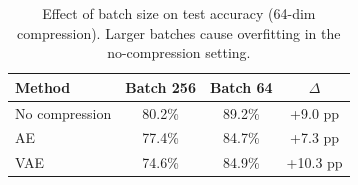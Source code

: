 \begin{table}[h]
\centering
\caption{Effect of batch size on test accuracy (64-dim compression). Larger batches cause overfitting in the no-compression setting.}
\label{tab:batchsize}
\begin{tabular}{lccc}
\toprule
\textbf{Method} & \textbf{Batch 256} & \textbf{Batch 64} & \textbf{$\Delta$} \\
\midrule
No compression & 80.2\% & 89.2\% & +9.0 pp \\
AE             & 77.4\% & 84.7\% & +7.3 pp \\
VAE            & 74.6\% & 84.9\% & +10.3 pp \\
\bottomrule
\end{tabular}
\end{table}
